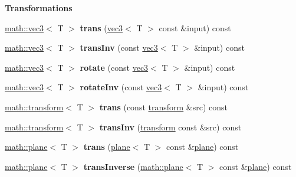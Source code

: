 \begin{Indent}{\bf Transformations}\par
{\em \label{_amgrpe4ba47693cf74a797e63f4557d4b88f4}
 }\begin{DoxyCompactItemize}
\item 
\hypertarget{classmath_1_1transform_a420cfe5681bb96592aa0d8cbc2431997}{
\hyperlink{classmath_1_1vec3}{math::vec3}$<$ T $>$ {\bfseries trans} (\hyperlink{classmath_1_1vec3}{vec3}$<$ T $>$ const \&input) const }
\label{classmath_1_1transform_a420cfe5681bb96592aa0d8cbc2431997}

\item 
\hypertarget{classmath_1_1transform_aca2ecc61f4b74148f8b74279610810dc}{
\hyperlink{classmath_1_1vec3}{math::vec3}$<$ T $>$ {\bfseries transInv} (const \hyperlink{classmath_1_1vec3}{vec3}$<$ T $>$ \&input) const }
\label{classmath_1_1transform_aca2ecc61f4b74148f8b74279610810dc}

\item 
\hypertarget{classmath_1_1transform_aa665041c09aa246a0ceffc9fc4148302}{
\hyperlink{classmath_1_1vec3}{math::vec3}$<$ T $>$ {\bfseries rotate} (const \hyperlink{classmath_1_1vec3}{vec3}$<$ T $>$ \&input) const }
\label{classmath_1_1transform_aa665041c09aa246a0ceffc9fc4148302}

\item 
\hypertarget{classmath_1_1transform_acd36581c30a182964c7373b6221af9c0}{
\hyperlink{classmath_1_1vec3}{math::vec3}$<$ T $>$ {\bfseries rotateInv} (const \hyperlink{classmath_1_1vec3}{vec3}$<$ T $>$ \&input) const }
\label{classmath_1_1transform_acd36581c30a182964c7373b6221af9c0}

\item 
\hypertarget{classmath_1_1transform_a4d23903d2f5143b8b7ec50a1c684ab22}{
\hyperlink{classmath_1_1transform}{math::transform}$<$ T $>$ {\bfseries trans} (const \hyperlink{classmath_1_1transform}{transform} \&src) const }
\label{classmath_1_1transform_a4d23903d2f5143b8b7ec50a1c684ab22}

\item 
\hypertarget{classmath_1_1transform_acbea75cfac155a7ad39855c3e4197e67}{
\hyperlink{classmath_1_1transform}{math::transform}$<$ T $>$ {\bfseries transInv} (\hyperlink{classmath_1_1transform}{transform} const \&src) const }
\label{classmath_1_1transform_acbea75cfac155a7ad39855c3e4197e67}

\item 
\hypertarget{classmath_1_1transform_a9ee5efba69bc9dba9255fd00d8bf0f82}{
\hyperlink{classmath_1_1plane}{math::plane}$<$ T $>$ {\bfseries trans} (\hyperlink{classmath_1_1plane}{plane}$<$ T $>$ const \&\hyperlink{classmath_1_1plane}{plane}) const }
\label{classmath_1_1transform_a9ee5efba69bc9dba9255fd00d8bf0f82}

\item 
\hypertarget{classmath_1_1transform_a245be345ffb30cbd49cae7e03742a836}{
\hyperlink{classmath_1_1plane}{math::plane}$<$ T $>$ {\bfseries transInverse} (\hyperlink{classmath_1_1plane}{math::plane}$<$ T $>$ const \&\hyperlink{classmath_1_1plane}{plane}) const }
\label{classmath_1_1transform_a245be345ffb30cbd49cae7e03742a836}

\end{DoxyCompactItemize}
\end{Indent}
